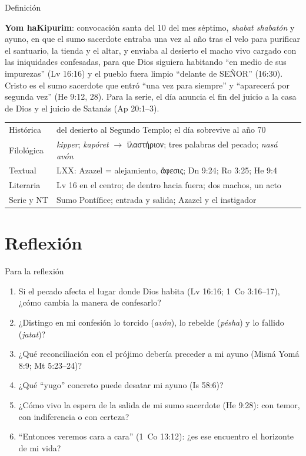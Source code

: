 \documentclass[hyperref={bookmarks=false},aspectratio=169]{beamer}
\newcommand{\grc}[1]{\foreignlanguage{ancientgreek}{#1}}
\newcommand{\SENOR}{S{\fontsize{0.78em}{1em}\selectfont EÑOR}}
\begin{document}
\begin{frame}{Definición}
\begin{tcolorbox}[colback=papiro,colframe=tierraroja,boxrule=1pt,arc=3pt,fontupper=\scriptsize]
\textbf{Yom haKipurim}: convocación santa del 10 del mes séptimo, \emph{shabat shabatón} y ayuno, en que el sumo sacerdote entraba una vez al año tras el velo para purificar el santuario, la tienda y el altar, y enviaba al desierto el macho vivo cargado con las iniquidades confesadas, para que Dios siguiera habitando ``en medio de sus impurezas'' (Lv 16:16) y el pueblo fuera limpio ``delante de \SENOR'' (16:30). Cristo es el sumo sacerdote que entró ``una vez para siempre'' y ``aparecerá por segunda vez'' (He 9:12, 28). Para la serie, el día anuncia el fin del juicio a la casa de Dios y el juicio de Satanás (Ap 20:1--3).
\end{tcolorbox}
\tiny\renewcommand{\arraystretch}{1.1}
\begin{tabular}{@{}L{2.0cm}L{9.6cm}@{}}
\toprule
Histórica & del desierto al Segundo Templo; el día sobrevive al año 70 \\
Filológica & \emph{kipper}; \emph{kapóret} $\rightarrow$ \grc{ἱλαστήριον}; tres palabras del pecado; \emph{nasá avón} \\
Textual & LXX: Azazel = alejamiento, \grc{ἄφεσις}; Dn 9:24; Ro 3:25; He 9:4 \\
Literaria & Lv 16 en el centro; de dentro hacia fuera; dos machos, un acto \\
Serie y NT & Sumo Pontífice; entrada y salida; Azazel y el instigador \\
\bottomrule
\end{tabular}
\end{frame}

\section{Reflexión}

\begin{frame}{Para la reflexión}
\small
\begin{enumerate}\setlength{\itemsep}{3pt}
\item Si el pecado afecta el lugar donde Dios habita (Lv 16:16; 1~Co 3:16--17), ¿cómo cambia la manera de confesarlo?
\item ¿Distingo en mi confesión lo torcido (\emph{avón}), lo rebelde (\emph{pésha}) y lo fallido (\emph{jatat})?
\item ¿Qué reconciliación con el prójimo debería preceder a mi ayuno (Misná Yomá 8:9; Mt 5:23--24)?
\item ¿Qué ``yugo'' concreto puede desatar mi ayuno (Is 58:6)?
\item ¿Cómo vivo la espera de la salida de mi sumo sacerdote (He 9:28): con temor, con indiferencia o con certeza?
\item ``Entonces veremos cara a cara'' (1~Co 13:12): ¿es ese encuentro el horizonte de mi vida?
\end{enumerate}
\end{frame}
\end{document}

